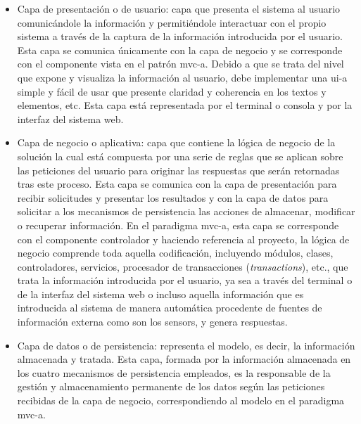 \documentclass[12pt,a4paper, twoside]{report}
\begin{document}
	\begin{itemize}
		\item Capa de presentación o de usuario: capa que presenta el sistema al usuario comunicándole la información y permitiéndole interactuar con el propio sistema a través de la captura de la información introducida por el usuario. Esta capa se comunica únicamente con la capa de negocio y se corresponde con el componente vista en el patrón \gls{mvc-a}. Debido a que se trata del nivel que expone y visualiza la información al usuario, debe implementar una \gls{ui-a} simple y fácil de usar que presente claridad y coherencia en los textos y elementos, etc. Esta capa está representada por el terminal o consola y por la interfaz del sistema web.
	
		\item Capa de negocio o aplicativa: capa que contiene la lógica de negocio de la solución la cual está compuesta por una serie de reglas que se aplican sobre las peticiones del usuario para originar las respuestas que serán retornadas tras este proceso. Esta capa se comunica con la capa de presentación para recibir solicitudes y presentar los resultados y con la capa de datos para solicitar a los mecanismos de persistencia las acciones de almacenar, modificar o recuperar información. En el paradigma \gls{mvc-a}, esta capa se corresponde con el componente controlador y haciendo referencia al proyecto, la lógica de negocio comprende toda aquella codificación, incluyendo módulos, clases, controladores, servicios, procesador de transacciones (\textit{\glspl{transaction}}), etc., que trata la información introducida por el usuario, ya sea a través del terminal o de la interfaz del sistema web o incluso aquella información que es introducida al sistema de manera automática procedente de fuentes de información externa como son los \glspl{sensor}, y genera respuestas.
		
		\item Capa de datos o de persistencia: representa el modelo, es decir, la información almacenada y tratada. Esta capa, formada por la información almacenada en los cuatro mecanismos de persistencia empleados, es la responsable de la gestión y almacenamiento permanente de los datos según las peticiones recibidas de la capa de negocio, correspondiendo al modelo en el paradigma \gls{mvc-a}.
	\end{itemize} 	
	
\end{document}
